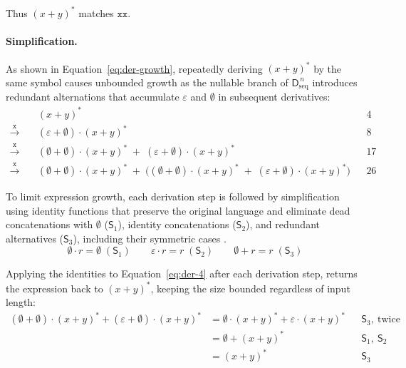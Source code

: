 Thus $(x+y)^{*}$ matches $\mathtt{xx}$.

%

\paragraph{Simplification.}
As shown in Equation~\eqref{eq:der-growth}, repeatedly deriving
$(x+y)^{*}$ by the same symbol causes unbounded growth as the nullable
branch of $\mathsf{D}_{\mathrm{seq}}^{\,n}$ introduces redundant
alternations that accumulate $\varepsilon$ and $\emptyset$ in
subsequent derivatives:
\begin{equation}\label{eq:der-growth}
\begin{aligned}
& (x+y)^{*} && 4 \\
\xrightarrow{\;\mathtt{x}\;}\quad
& (\varepsilon+\emptyset)\cdot(x+y)^{*} && 8 \\
\xrightarrow{\;\mathtt{x}\;}\quad
& (\emptyset+\emptyset)\cdot(x+y)^{*}
  \;+\; (\varepsilon+\emptyset)\cdot(x+y)^{*} && 17 \\
\xrightarrow{\;\mathtt{x}\;}\quad
& (\emptyset+\emptyset)\cdot(x+y)^{*}
  \;+\; \bigl( (\emptyset+\emptyset)\cdot(x+y)^{*}
  \;+\; (\varepsilon+\emptyset)\cdot(x+y)^{*} \bigr) && 26
\end{aligned}
\end{equation}

To limit expression growth, 
each derivation step is followed by simplification 
using identity functions that preserve the original language and eliminate 
dead concatenations with $\emptyset$ ($\mathsf{S}_{1}$), 
identity concatenations ($\mathsf{S}_{2}$),
and redundant alternatives ($\mathsf{S}_{3}$),
including their symmetric cases \citep[p.5]{sulzmann_slides}.
\begin{equation}\label{eq:simp-identities}
\emptyset \cdot r = \emptyset \;(\mathsf{S}_{1})
\qquad
\varepsilon \cdot r = r \;(\mathsf{S}_{2})
\qquad
\emptyset + r = r \;(\mathsf{S}_{3})
\end{equation}

Applying the identities to Equation~\eqref{eq:der-4} after each derivation step, 
returns the expression back to $(x+y)^{*}$,
keeping the size bounded regardless of input length:
\begin{equation}\label{eq:der-6}
\begin{aligned}
(\emptyset + \emptyset) \cdot (x+y)^{*} + (\varepsilon + \emptyset) \cdot (x+y)^{*}
  &= \emptyset \cdot (x+y)^{*} + \varepsilon \cdot (x+y)^{*}
  &&\mathsf{S}_{3},\ \text{twice} \\
  &= \emptyset + (x+y)^{*}
  &&\mathsf{S}_{1},\ \mathsf{S}_{2} \\
  &= (x+y)^{*}
  &&\mathsf{S}_{3}
\end{aligned}
\end{equation}

